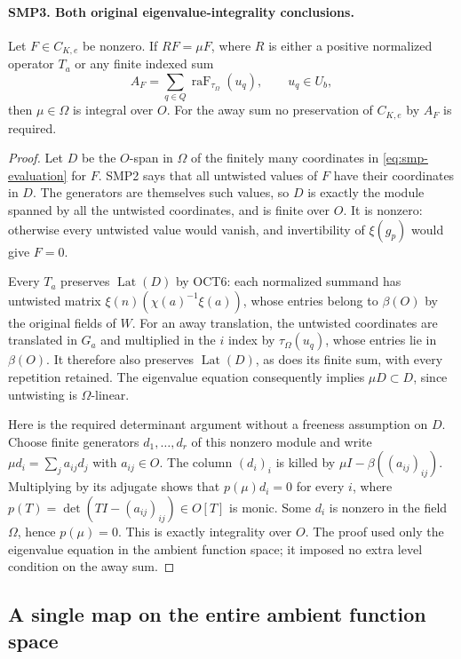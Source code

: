 \paragraph{SMP3. Both original eigenvalue-integrality conclusions.}
\label{claim:SMP3}
Let $F\in C_{K,e}$ be nonzero.  If $R F=\mu F$, where
$R$ is either a positive normalized operator $T_a$ or
any finite indexed sum
\[
             A_F=\sum_{q\in Q}\operatorname{raF}_{\tau_\Omega}(u_q),
                    \qquad u_q\in U_b,
\]
then $\mu\in\Omega$ is integral over $O$.
For the away sum no preservation of $C_{K,e}$ by
$A_F$ is required.
\begin{proof}
Let $D$ be the $O$-span in $\Omega$ of the finitely
many coordinates in \eqref{eq:smp-evaluation} for $F$.
SMP2 says that all untwisted values of $F$ have their
coordinates in $D$.  The generators are themselves such
values, so $D$ is exactly the module spanned by all the
untwisted coordinates, and is finite over $O$.
It is nonzero: otherwise every untwisted value would
vanish, and invertibility of $\xi(g_p)$ would give $F=0$.

Every $T_a$ preserves $\operatorname{Lat}(D)$ by OCT6:
each normalized summand has untwisted matrix
$\xi(n)(\chi(a)^{-1}\xi(a))$, whose entries belong
to $\beta(O)$ by the original fields of $W$.
For an away translation, the untwisted coordinates are
translated in $G_a$ and multiplied in the $i$ index
by $\tau_\Omega(u_q)$, whose entries lie in $\beta(O)$.
It therefore also preserves $\operatorname{Lat}(D)$,
as does its finite sum, with every repetition retained.
The eigenvalue equation consequently implies
$\mu D\subset D$, since untwisting is $\Omega$-linear.

Here is the required determinant argument without a
freeness assumption on $D$.  Choose finite generators
$d_1,\ldots,d_r$ of this nonzero module and write
$\mu d_i=\sum_j a_{ij}d_j$ with $a_{ij}\in O$.
The column $(d_i)_i$ is killed by
$\mu I-\beta((a_{ij})_{ij})$.  Multiplying by its
adjugate shows that
$p(\mu)d_i=0$ for every $i$, where
$p(T)=\det(TI-(a_{ij})_{ij})\in O[T]$ is monic.
Some $d_i$ is nonzero in the field $\Omega$, hence
$p(\mu)=0$.  This is exactly integrality over $O$.
The proof used only the eigenvalue equation in the
ambient function space; it imposed no extra level
condition on the away sum.
\end{proof}

\subsection{A single map on the entire ambient function space}

